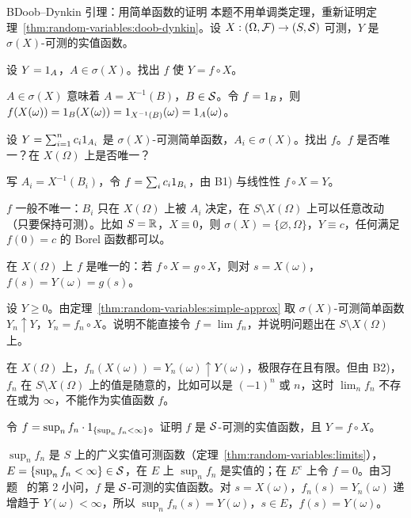 \begin{probleme}{B}{Doob--Dynkin 引理：用简单函数的证明}
本题不用单调类定理，重新证明定理~\ref{thm:random-variables:doob-dynkin}。设 $X:(\Omega,\mathcal{F})\to(S,\mathcal{S})$ 可测，$Y$ 是 $\sigma(X)$-可测的实值函数。
\begin{questions}
\item 设 $Y=1_A$，$A\in\sigma(X)$。找出 $f$ 使 $Y=f\circ X$。
\begin{solution}
$A\in\sigma(X)$ 意味着 $A=X^{-1}(B)$，$B\in\mathcal{S}$。令 $f=1_B$，则 $f(X(\omega))=1_B(X(\omega))=1_{X^{-1}(B)}(\omega)=1_A(\omega)$。
\end{solution}
\item 设 $Y=\sum_{i=1}^nc_i1_{A_i}$ 是 $\sigma(X)$-可测简单函数，$A_i\in\sigma(X)$。找出 $f$。$f$ 是否唯一？在 $X(\Omega)$ 上是否唯一？
\begin{solution}
写 $A_i=X^{-1}(B_i)$，令 $f=\sum_ic_i1_{B_i}$，由 B1) 与线性性 $f\circ X=Y$。

$f$ 一般不唯一：$B_i$ 只在 $X(\Omega)$ 上被 $A_i$ 决定，在 $S\setminus X(\Omega)$ 上可以任意改动（只要保持可测）。比如 $S=\mathbb{R}$，$X\equiv0$，则 $\sigma(X)=\{\varnothing,\Omega\}$，$Y\equiv c$，任何满足 $f(0)=c$ 的 Borel 函数都可以。

在 $X(\Omega)$ 上 $f$ 是唯一的：若 $f\circ X=g\circ X$，则对 $s=X(\omega)$，$f(s)=Y(\omega)=g(s)$。
\end{solution}
\item 设 $Y\geqslant0$。由定理~\ref{thm:random-variables:simple-approx} 取 $\sigma(X)$-可测简单函数 $Y_n\uparrow Y$，$Y_n=f_n\circ X$。说明不能直接令 $f=\lim f_n$，并说明问题出在 $S\setminus X(\Omega)$ 上。
\begin{solution}
在 $X(\Omega)$ 上，$f_n(X(\omega))=Y_n(\omega)\uparrow Y(\omega)$，极限存在且有限。但由 B2)，$f_n$ 在 $S\setminus X(\Omega)$ 上的值是随意的，比如可以是 $(-1)^n$ 或 $n$，这时 $\lim_nf_n$ 不存在或为 $\infty$，不能作为实值函数 $f$。
\end{solution}
\item 令 $f=\sup_nf_n\cdot1_{\{\sup_nf_n<\infty\}}$。证明 $f$ 是 $\mathcal{S}$-可测的实值函数，且 $Y=f\circ X$。
\begin{solution}
$\sup_nf_n$ 是 $S$ 上的广义实值可测函数（定理~\ref{thm:random-variables:limits}），$E=\{\sup_nf_n<\infty\}\in\mathcal{S}$，在 $E$ 上 $\sup_nf_n$ 是实值的；在 $E^c$ 上令 $f=0$。由习题~ 的第 2 小问，$f$ 是 $\mathcal{S}$-可测的实值函数。对 $s=X(\omega)$，$f_n(s)=Y_n(\omega)$ 递增趋于 $Y(\omega)<\infty$，所以 $\sup_nf_n(s)=Y(\omega)$，$s\in E$，$f(s)=Y(\omega)$。


\end{solution}
\end{questions}
\end{probleme}
